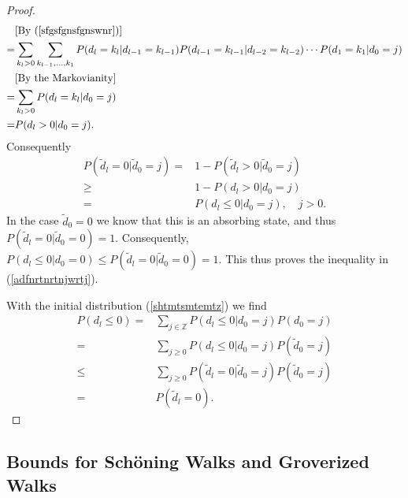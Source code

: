 \documentclass[a4paper,aps,floatfix]{revtex4}
\begin{document}
\begin{proof}
\begin{equation}
\begin{split}
& [\textrm{By (\ref{sfgsfgnsfgnswnr})}]\\
= &   \sum_{k_l>0} \sum_{k_{l-1},\ldots, k_{1}}P(d_l = k_l |d_{l-1} = k_{l-1})P(d_{l-1} = k_{l-1}|d_{l-2} = k_{l-2})\cdots  P(d_1 = k_1|d_0 = j)\\
& [\textrm{By the Markovianity}]\\
= &   \sum_{k_l>0}P(d_l = k_l|d_0 =j)\\
= & P(d_l > 0|d_0 =j).
\end{split}
\end{equation}
Consequently
\begin{equation}
\begin{split}
P(\tilde{d}_l =0 |\tilde{d}_0 = j)=  &1- P(\tilde{d}_l >0 |\tilde{d}_0 = j)\\
\geq   & 1-P(d_l > 0|d_0 =j)\\
= & P(d_l \leq 0|d_0 =j),\quad j>0.
\end{split}
\end{equation}
In the case $\tilde{d}_0 = 0$ we know that this is an absorbing state, and thus $P(\tilde{d}_l =0 |\tilde{d}_0 = 0) = 1$. Consequently, $P(d_l\leq 0|d_0 = 0)\leq P(\tilde{d}_l =0 |\tilde{d}_0 = 0) = 1$.
This thus proves the inequality in  (\ref{adfnrtnrtnjwrtj}).

With the initial distribution (\ref{shtmtsmtemtz}) we find
\begin{equation}
\begin{split}
P(d_l\leq 0) = & \sum_{j\in\mathbb{Z}}P(d_l\leq 0|d_0 = j)P(d_0 = j)\\
= & \sum_{j\geq 0}P(d_l\leq 0|d_0 = j)P(\tilde{d}_0 = j)\\
\leq  & \sum_{j\geq 0}P(\tilde{d}_l = 0|\tilde{d}_0 = j)P(\tilde{d}_0 = j)\\
= & P(\tilde{d}_l = 0).
\end{split}
\end{equation}

\end{proof}



 

\subsection{Bounds for Sch\"oning Walks and Groverized Walks}
\end{document}
